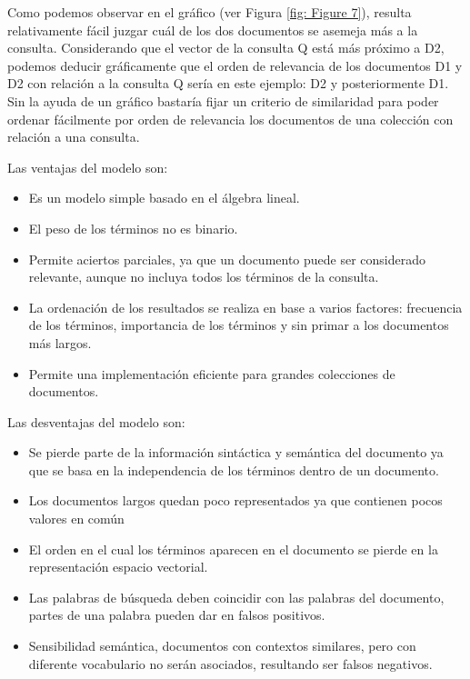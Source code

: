 \documentclass{article}
\begin{document}
Como podemos observar en el gráfico (ver Figura \ref{fig: Figure 7}), resulta relativamente fácil juzgar cuál de los dos documentos se asemeja más a la consulta. Considerando que el vector de la consulta Q está más próximo a D2, podemos deducir gráficamente que el orden de relevancia de los documentos D1 y D2 con relación a la consulta Q sería en este ejemplo: D2 y posteriormente D1. Sin la ayuda de un gráfico bastaría fijar un criterio de similaridad para poder ordenar fácilmente por orden de relevancia los documentos de una colección con relación a una consulta.

Las ventajas del modelo son:

\begin{itemize}
	\item Es un modelo simple basado en el álgebra lineal. 
	\item El peso de los términos no es binario. 
	\item Permite aciertos parciales, ya que un documento puede ser considerado relevante, aunque no incluya todos los términos de la consulta. 
	\item La ordenación de los resultados se realiza en base a varios factores: frecuencia de los términos, importancia de los términos y sin primar a 	los documentos más largos. 
	\item Permite una implementación eficiente para grandes colecciones de documentos.
\end{itemize}

Las desventajas del modelo son:

\begin{itemize}
	\item Se pierde parte de la información sintáctica y semántica del documento ya que se basa en la independencia de los términos dentro de un documento. 
	\item Los documentos largos quedan poco representados ya que contienen pocos valores en común 
	\item El orden en el cual los términos aparecen en el documento se pierde en la representación espacio vectorial. 
	\item Las palabras de búsqueda deben coincidir con las palabras del documento, partes de una palabra pueden dar en falsos positivos. 
	\item Sensibilidad semántica, documentos con contextos similares, pero con diferente vocabulario no serán asociados, resultando ser falsos negativos. 
\end{itemize}
\end{document}
